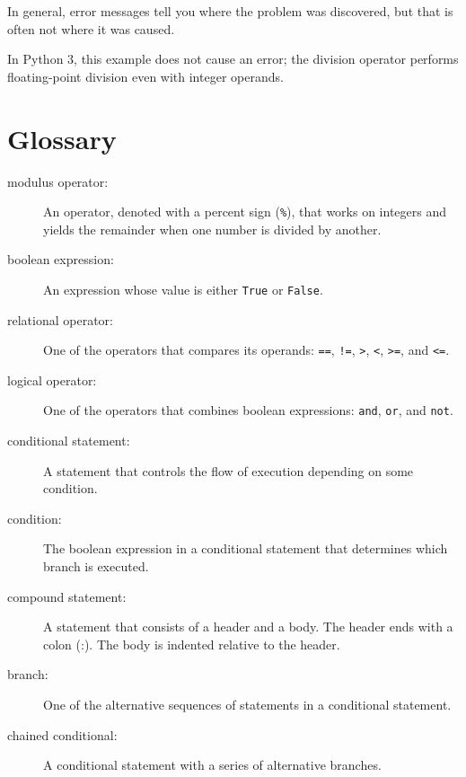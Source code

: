\documentclass[10pt]{book}
\begin{document}
In general, error messages tell you where the problem was discovered, 
but that is often not where it was caused.

In Python 3, this example does not cause an error; the division operator
performs floating-point division even with integer operands.


\section{Glossary}

\begin{description}

\item[modulus operator:]  An operator, denoted with a percent sign
({\tt \%}), that works on integers and yields the remainder when one
number is divided by another.

\item[boolean expression:]  An expression whose value is either 
{\tt True} or {\tt False}.

\item[relational operator:] One of the operators that compares
its operands: {\tt ==}, {\tt !=}, {\tt >}, {\tt <}, {\tt >=}, and {\tt <=}.

\item[logical operator:] One of the operators that combines boolean
expressions: {\tt and}, {\tt or}, and {\tt not}.

\item[conditional statement:]  A statement that controls the flow of
execution depending on some condition.

\item[condition:] The boolean expression in a conditional statement
that determines which branch is executed.

\item[compound statement:]  A statement that consists of a header
and a body.  The header ends with a colon (:).  The body is indented
relative to the header.

\item[branch:] One of the alternative sequences of statements in
a conditional statement.

\item[chained conditional:]  A conditional statement with a series
of alternative branches.


\end{description}
\end{document}
